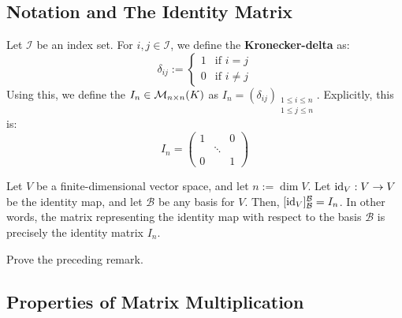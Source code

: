 \subsection{Notation and The Identity Matrix}

Let $\mathcal{I}$ be an index set. For $i, j \in \mathcal{I}$, we define the \textbf{Kronecker-delta} as:
\begin{equation*}
    \delta_{ij} := \begin{cases} 1 & \text{if } i = j \\ 0 & \text{if } i \neq j \end{cases}
\end{equation*}
Using this, we define the  $I_n \in \mathcal{M}_{n \times n}(K)$ as $I_n = (\delta_{ij})_{\substack{1 \le i \le n \\ 1 \le j \le n}}$. Explicitly, this is:
\begin{equation*}
    I_n = \begin{pmatrix} 1 & & 0 \\ & \ddots & \\ 0 & & 1 \end{pmatrix}
\end{equation*}

\begin{remark}
Let $V$ be a finite-dimensional vector space, and let $n := \dim V$. Let $\operatorname{id}_V: V \to V$ be the identity map, and let $\mathcal{B}$ be any basis for $V$. Then, $[\operatorname{id}_V]_{\mathcal{B}}^{\mathcal{B}} = I_n$. In other words, the matrix representing the identity map with respect to the basis $\mathcal{B}$ is precisely the identity matrix $I_n$.
\end{remark}

\begin{exercise}
Prove the preceding remark.
\end{exercise}

\subsection{Properties of Matrix Multiplication}

